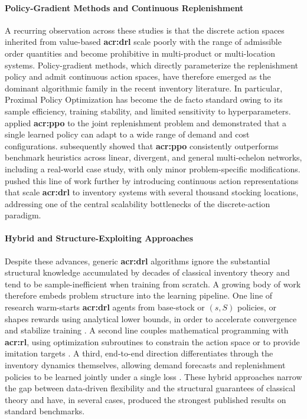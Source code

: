 \paragraph{\textbf{Policy-Gradient Methods and Continuous Replenishment}}
A recurring observation across these studies is that the discrete action spaces inherited from value-based \textbf{{acr:drl}} scale poorly with the range of admissible order quantities and become prohibitive in multi-product or multi-location systems. Policy-gradient methods, which directly parameterize the replenishment policy and admit continuous action spaces, have therefore emerged as the dominant algorithmic family in the recent inventory literature. In particular, Proximal Policy Optimization \citep{schulman2017ppo} has become the de facto standard owing to its sample efficiency, training stability, and limited sensitivity to hyperparameters. \citet{vanvuchelen2020ppo} applied \textbf{{acr:ppo}} to the joint replenishment problem and demonstrated that a single learned policy can adapt to a wide range of demand and cost configurations. \citet{geevers2024ppo} subsequently showed that \textbf{{acr:ppo}} consistently outperforms benchmark heuristics across linear, divergent, and general multi-echelon networks, including a real-world case study, with only minor problem-specific modifications. \citet{vanvuchelen2024continuous} pushed this line of work further by introducing continuous action representations that scale \textbf{{acr:drl}} to inventory systems with several thousand stocking locations, addressing one of the central scalability bottlenecks of the discrete-action paradigm.

\paragraph{\textbf{Hybrid and Structure-Exploiting Approaches}}
Despite these advances, generic \textbf{{acr:drl}} algorithms ignore the substantial structural knowledge accumulated by decades of classical inventory theory and tend to be sample-inefficient when training from scratch. A growing body of work therefore embeds problem structure into the learning pipeline. One line of research warm-starts \textbf{{acr:drl}} agents from base-stock or $(s,S)$ policies, or shapes rewards using analytical lower bounds, in order to accelerate convergence and stabilize training \citep[e.g.,][]{kaynov2024structured}. A second line couples mathematical programming with \textbf{{acr:rl}}, using optimization subroutines to constrain the action space or to provide imitation targets \citep{harsha2022mathprogrl}. A third, end-to-end direction differentiates through the inventory dynamics themselves, allowing demand forecasts and replenishment policies to be learned jointly under a single loss \citep{madeka2022endtoend}. These hybrid approaches narrow the gap between data-driven flexibility and the structural guarantees of classical theory and have, in several cases, produced the strongest published results on standard benchmarks.

